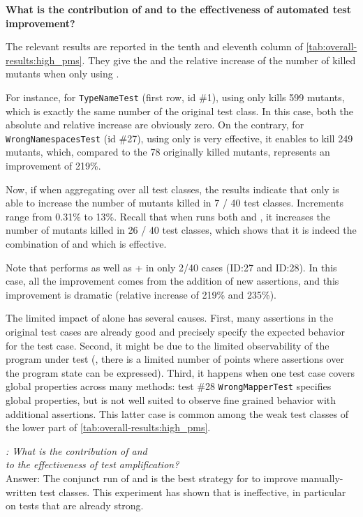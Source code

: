 \textbf{What is the contribution of \Iampl{} and \Aampl{} to the effectiveness of automated test improvement?}

The relevant results are reported in the tenth and eleventh column of \autoref{tab:overall-results:high_pms}.
They give the \ams and the relative increase of the number of killed mutants when only using \Aampl.

For instance, for \texttt{TypeNameTest} (first row, id \#1), using only \Aampl kills 599 mutants, which is exactly the same number of the original test class. 
In this case, both the absolute and relative increase are obviously zero.
On the contrary, for \texttt{WrongNamespacesTest} (id \#27), using only \Aampl  is very effective, it enables \dspot to kill 249 mutants, which, compared to the 78 originally killed mutants, represents an improvement of 219\%. 

Now, if when aggregating over all test classes, the results indicate that \Aampl only is able to increase the number of mutants killed in 7 / 40 test classes. 
Increments range from 0.31\% to 13\%. 
Recall that when \dspot runs both \Iampl{} and \Aampl, it increases the number of mutants killed in 26 / 40 test classes, which shows that it is indeed the combination of \Aampl and \Iampl which is effective.

Note that \Aampl{} performs as well as \Iampl + \Aampl in only 2/40 cases (ID:27 and ID:28). In this case, all the improvement comes from the addition of new assertions, and this improvement is dramatic (relative increase of 219\% and 235\%).

The limited impact of \Aampl alone has several causes. 
First, many assertions in the original test cases are already good and precisely specify the expected behavior for the test case.
Second, it might be due to the limited observability of the program under test (\ie, there is a limited number of points where assertions over the program state can be expressed).
Third, it happens when one test case covers global properties across many methods: test \#28 \texttt{WrongMapperTest} specifies global properties, but is not well suited to observe fine grained behavior with additional assertions. 
This latter case is common among the weak test classes of the lower part of \autoref{tab:overall-results:high_pms}.
\
~\\

\begin{mdframed}
	\textit{\rqAmplVersusIAmpl: What is the contribution of \Iampl{} and \\\Aampl{} to the effectiveness of test amplification?}\\
	Answer: The conjunct run of \Iampl{} and \Aampl{} is the best strategy for \dspot{} to improve manually-written test classes. 
	This experiment has shown that \Aampl{} is ineffective, in particular on tests that are already strong.
\end{mdframed}
~\\

